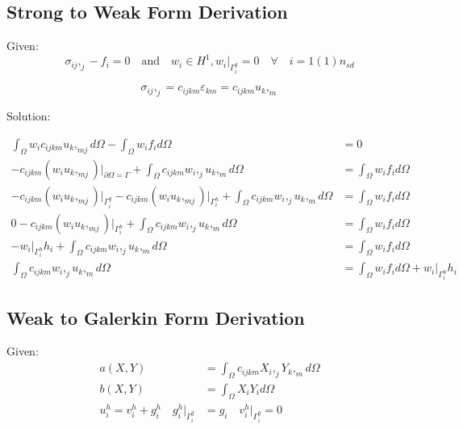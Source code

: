 \documentclass[a4paper, 12pt]{article}
\begin{document}
\subsection{Strong to Weak Form Derivation} \label{sec:WeakDer}

Given:
\begin{equation*}
\sigma_{ij},_{j} - f_{i} = 0 \quad \text{and} \quad
w_{i} \in H^1, w_{i}\Big|_{\Gamma^{g}_{i}} = 0
    \quad \forall \quad i=1(1)n_{sd}
\end{equation*}

\begin{equation*}
\sigma_{ij},_{j} = c_{ijkm} \varepsilon_{km} = c_{ijkm} u_{k},_{m}
\end{equation*}

\noindent
Solution:

\begin{align*}
\int_{\Omega} w_{i} c_{ijkm} u_{k},_{mj} d\Omega - 
  \int_{\Omega} w_{i} f_{i} d\Omega &= 0 \\
-c_{ijkm}(w_{i} u_{k},_{mj})\Big|_{\partial\Omega = \Gamma} 
  + \int_{\Omega} c_{ijkm} w_{i},_{j} u_{k},_{m} d\Omega
  &=\int_{\Omega} w_{i} f_{i} d\Omega  \\
-c_{ijkm}(w_{i} u_{k},_{mj})\Big|_{\Gamma^{g}_{i}} 
-c_{ijkm}(w_{i} u_{k},_{mj})\Big|_{\Gamma^{h}_{i}} 
  + \int_{\Omega} c_{ijkm} w_{i},_{j} u_{k},_{m} d\Omega
  &=\int_{\Omega} w_{i} f_{i} d\Omega \\
0
 -c_{ijkm}(w_{i} u_{k},_{mj})\Big|_{\Gamma^{h}_{i}} 
  + \int_{\Omega} c_{ijkm} w_{i},_{j} u_{k},_{m} d\Omega
  &=\int_{\Omega} w_{i} f_{i} d\Omega \\
-w_{i}\Big|_{\Gamma^{h}_{i}} h_{i}
  + \int_{\Omega} c_{ijkm} w_{i},_{j} u_{k},_{m} d\Omega
  &=\int_{\Omega} w_{i} f_{i} d\Omega \\
\int_{\Omega} c_{ijkm} w_{i},_{j} u_{k},_{m} d\Omega &=
  \int_{\Omega} w_{i} f_{i} d\Omega +
  w_{i}\Big|_{\Gamma^{h}_{i}} h_{i}
\end{align*}

\newpage
\subsection{Weak to Galerkin Form Derivation} \label{sec:GalerkinDer}

Given:
\begin{align*}
a( X, Y ) &= 
  \int_{\Omega} c_{ijkm} X_{i},_{j} Y_{k},_{m} d\Omega \\
b( X, Y ) &= 
  \int_{\Omega} X_{i} Y_{i} d\Omega \\
u^{h}_{i} = 
  v^{h}_{i} + g^{h}_{i} 
  \quad
  g^{h}_{i}\Big|_{\Gamma^{g}_{i}} &= g_{i} 
  \quad 
  v^{h}_{i}\Big|_{\Gamma^{g}_{i}} = 0
\end{align*}
\end{document}

